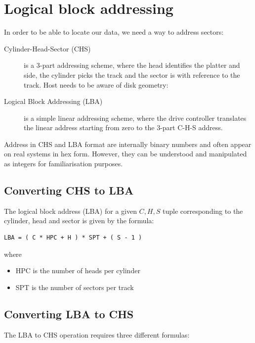 \section{Logical block addressing}\label{logical-block-addressing}

In order to be able to locate our data, we need a way to address
sectors:

\begin{description}
\item[Cylinder-Head-Sector (CHS)]
is a 3-part addressing scheme, where the head identifies the platter and
side, the cylinder picks the track and the sector is with reference to
the track. Host needs to be aware of disk geometry:
\item[Logical Block Addressing (LBA)]
is a simple linear addressing scheme, where the drive controller
translates the linear address starting from zero to the 3-part C-H-S
address.
\end{description}

Address in CHS and LBA format are internally binary numbers and often
appear on real systems in hex form. However, they can be understood and
manipulated as integers for familiarisation purposes.

\subsection{Converting CHS to LBA}\label{converting-chs-to-lba}

The logical block address (LBA) for a given $C, H, S$ tuple corresponding to the cylinder, head and sector is given by the formula:

\begin{verbatim}
LBA = ( C * HPC + H ) * SPT + ( S - 1 )
\end{verbatim}

where

\begin{itemize}
\item
  HPC is the number of heads per cylinder
\item
  SPT is the number of sectors per track
\end{itemize}

\subsection{Converting LBA to CHS}\label{converting-lba-to-chs}

The LBA to CHS operation requires three different formulas:

